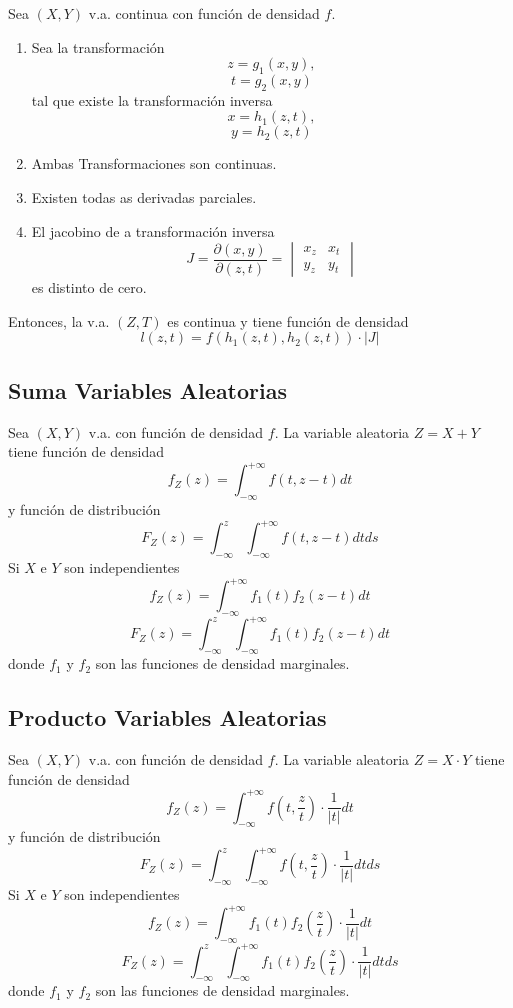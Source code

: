 \begin{theo}
  Sea $(X,Y)$ v.a. continua con función de densidad $f$.
  \begin{enumerate}[label=(\roman*)]
    \item Sea la transformación
      \[ 
        z = g_{1}(x,y) ,
      \] 
      \[ 
        t = g_{2}(x,y) 
      \] 
      tal que existe la transformación inversa
      \[ 
        x = h_{1}(z,t) ,
      \] 
      \[ 
        y = h_{2}(z,t) 
      \] 
    \item Ambas Transformaciones son continuas.
    \item Existen todas as derivadas parciales.
    \item El jacobino de a transformación inversa
      \[ 
        J = \frac{\partial(x,y)}{\partial(z,t)} 
        = 
        \begin{vmatrix}
           x_{z} & x_{t} \\
           y_{z} & y_{t}
        \end{vmatrix} 
      \] 
      es distinto de cero.
  \end{enumerate}
  Entonces, la v.a. $(Z, T)$ es continua y tiene función de densidad
  \[ 
    l(z,t) = f(h_{1}(z,t), h_{2}(z,t)) \cdot | J | 
  \] 
\end{theo}

\subsection{Suma Variables Aleatorias}

\begin{prop}
  Sea $(X,Y)$ v.a. con función de densidad $f$. La variable aleatoria $Z = X + Y$ tiene función de densidad
  \[ 
    f_{Z}(z) = \int_{-\infty}^{+\infty} f(t, z - t) dt
  \] 
  y función de distribución
  \[ 
    F_{Z}(z) = \int_{-\infty}^{z} \int_{-\infty}^{+\infty} f(t, z - t) dt ds
  \] 
  Si $X$ e $Y$ son independientes
  \[ 
    f_{Z}(z) = \int_{-\infty}^{+\infty} f_{1}(t)f_{2}(z - t) dt
  \] 
  \[ 
    F_{Z}(z) = \int_{-\infty}^{z} \int_{-\infty}^{+\infty} f_{1}(t)f_{2}(z - t) dt
  \] 
  donde $f_{1}$ y $f_{2}$ son las funciones de densidad marginales.
\end{prop}

\subsection{Producto Variables Aleatorias}

\begin{prop}
  Sea $(X,Y)$ v.a. con función de densidad $f$. La variable aleatoria $Z = X \cdot Y$ tiene función de densidad
  \[ 
    f_{Z}(z) = \int_{-\infty}^{+\infty} f(t, \frac{z}{t}) \cdot \frac{1}{| t |} dt
  \] 
  y función de distribución
  \[ 
    F_{Z}(z) = \int_{-\infty}^{z} \int_{-\infty}^{+\infty} f(t, \frac{z}{t}) \cdot \frac{1}{| t |} dt ds
  \] 
  Si $X$ e $Y$ son independientes
  \[ 
    f_{Z}(z) = \int_{-\infty}^{+\infty} f_{1}(t)f_{2}(\frac{z}{t}) \cdot \frac{1}{| t |} dt
  \] 
  \[ 
    F_{Z}(z) = \int_{-\infty}^{z} \int_{-\infty}^{+\infty} f_{1}(t)f_{2}(\frac{z}{t}) \cdot \frac{1}{| t |} dt ds
  \] 
  donde $f_{1}$ y $f_{2}$ son las funciones de densidad marginales.
\end{prop}

